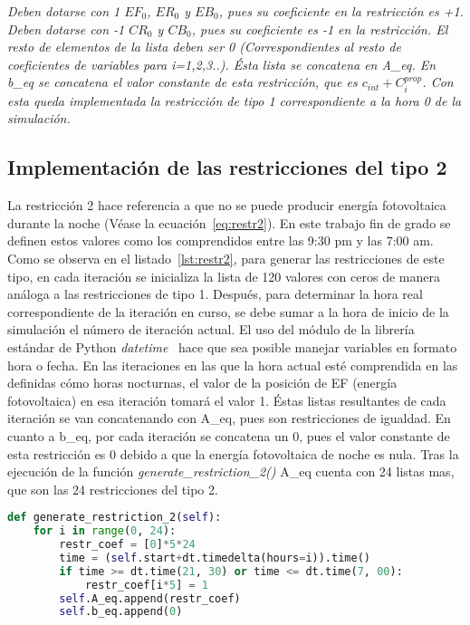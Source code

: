 \textit{Deben dotarse con 1 $ EF_{0} $, $ ER_{0} $ y $ EB_{0} $, pues su coeficiente en la restricción es +1. Deben dotarse con -1 $ CR_{0} $ y $ CB_{0} $, pues su coeficiente es -1 en la restricción. El resto de elementos de la lista deben ser 0 (Correspondientes al resto de coeficientes de variables para i=1,2,3..). Ésta lista se concatena en A\_eq. En b\_eq se concatena el valor constante de esta restricción, que es $ c_{int} + C_{i}^{prop} $. Con esta queda implementada la restricción de tipo 1 correspondiente a la hora 0 de la simulación.}

\subsection{Implementación de las restricciones del tipo 2}
La restricción 2 hace referencia a que no se puede producir energía fotovoltaica durante la noche (Véase la ecuación~\ref{eq:restr2}). En este trabajo fin de grado se definen estos valores como los comprendidos entre las 9:30 pm y las 7:00 am. Como se observa en el listado~\ref{lst:restr2}, para generar las restricciones de este tipo, en cada iteración se inicializa la lista de 120 valores con ceros de manera análoga a las restricciones de tipo 1. Después, para determinar la hora real correspondiente de la iteración en curso, se debe sumar a la hora de inicio de la simulación el número de iteración actual. El uso del módulo de la librería estándar de Python \textit{datetime}~\cite{Dtpy} hace que sea posible manejar variables en formato hora o fecha. En las iteraciones en las que la hora actual esté comprendida en las definidas cómo horas nocturnas, el valor de la posición de EF (energía fotovoltaica) en esa iteración tomará el valor 1. Éstas listas resultantes de cada iteración se van concatenando con A\_eq, pues son restricciones de igualdad. En cuanto a b\_eq, por cada iteración se concatena un 0, pues el valor constante de esta restricción es 0 debido a que la energía fotovoltaica de noche es nula. Tras la ejecución de la función \textit{generate\_restriction\_2()} A\_eq cuenta con 24 listas mas, que son las 24 restricciones del tipo 2.
\begin{lstlisting}[language=Python,float=ht,caption={Restricciones del tipo 2},label={lst:restr2}]
def generate_restriction_2(self):
    for i in range(0, 24):
        restr_coef = [0]*5*24
        time = (self.start+dt.timedelta(hours=i)).time()
        if time >= dt.time(21, 30) or time <= dt.time(7, 00):
            restr_coef[i*5] = 1
        self.A_eq.append(restr_coef)
        self.b_eq.append(0)
\end{lstlisting}
